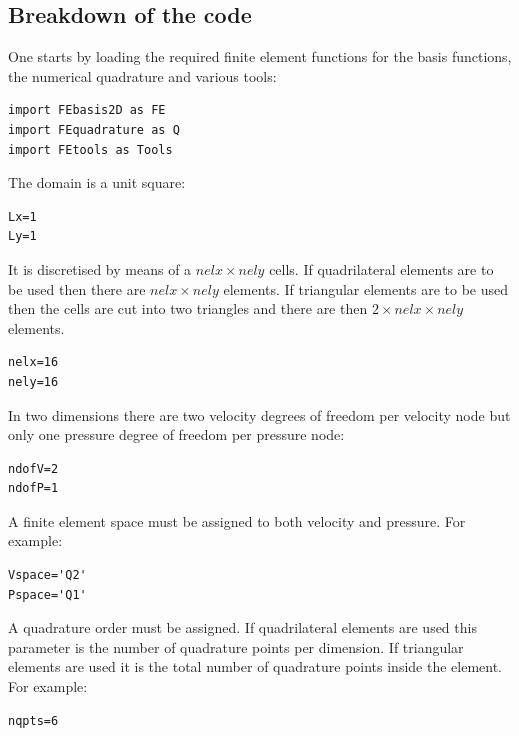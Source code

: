 \newpage
\subsection*{Breakdown of the code}

One starts by loading the required finite element functions 
for the basis functions, the numerical quadrature and various tools:
\begin{lstlisting}
import FEbasis2D as FE
import FEquadrature as Q
import FEtools as Tools 
\end{lstlisting}

The domain is a unit square:
\begin{lstlisting}
Lx=1
Ly=1
\end{lstlisting}

It is discretised by means of a $nelx\times nely$ cells. If quadrilateral 
elements are to be used then there are $nelx\times nely$ elements. If 
triangular elements are to be used then the cells are cut into two 
triangles and there are then $2\times nelx\times nely$ elements.

\begin{lstlisting}
nelx=16
nely=16
\end{lstlisting}


In two dimensions there are two velocity degrees of freedom per 
velocity node but only one pressure degree of freedom per pressure node:
\begin{lstlisting}
ndofV=2
ndofP=1
\end{lstlisting}

A finite element space must be assigned to both velocity and pressure. For example: 
\begin{lstlisting}
Vspace='Q2'
Pspace='Q1'
\end{lstlisting}

A quadrature order must be assigned. If quadrilateral elements are used
this parameter is the number of quadrature points per dimension. 
If triangular elements are used it is the total number of quadrature points 
inside the element. For example: 
\begin{lstlisting}
nqpts=6
\end{lstlisting}

